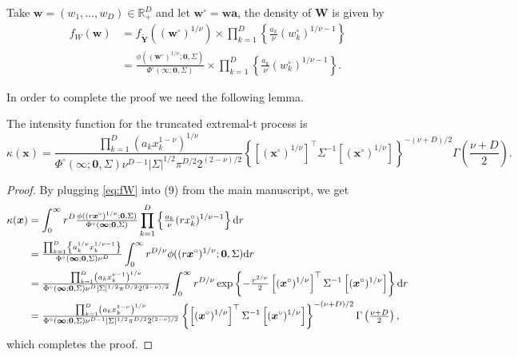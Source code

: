 \documentclass[lineno]{biometrika}
\begin{document}
Take $\bm w = (w_1, \ldots, w_D) \in \mathbb{R}^D_+$ and let $\bm w^\circ = \bm w \bm a$, the density of $\bm W$ is given by
%
\begin{align}
\label{eq:fW}
f_W(\bm w) &= f_{\tilde{\bm Y}} \left( \left( \bm w^\circ \right)^{1/\nu} \right) \times \prod_{k=1}^D \left\{ \frac{a_k}{\nu} \left(w_k^\circ \right)^{1/\nu-1} \right\} \nonumber \\
&= \frac{\phi\left( \left( \bm w^\circ \right)^{1/\nu} ;\bm 0, \Sigma \right)} {\Phi^\circ(\bm \infty;\bm 0, \Sigma)} 
\times \prod_{k=1}^D \left\{ \frac{a_k}{\nu} \left(w_k^\circ\right)^{1/\nu-1} \right\}.
\end{align}
%

In order to complete the proof we need the following lemma.

\begin{lemma}
\label{lem:kappEt}
The intensity function for the truncated extremal-t process is
%
\begin{equation*}
\kappa(\bm x) = \frac{\prod_{k=1}^D \left(a_k x_k^{1-\nu}\right)^{1/\nu}}{\Phi^\circ(\bm \infty;\bm 0, \Sigma) \nu^{D-1}|\Sigma|^{1/2}\pi^{D/2}2^{(2-\nu)/2}} \left\{\left[(\bm x^\circ)^{1/\nu}\right]^\top \Sigma^{-1}\left[(\bm x^\circ)^{1/\nu}\right]\right\}^{-(\nu+D)/2} \Gamma\left(\frac{\nu+D}{2}\right).
\end{equation*}
\end{lemma}

\begin{proof}

By plugging \eqref{eq:fW} into (9) from the main manuscript, we get 
%
\begin{align*}
\kappa(\bm x) &= \int_0^\infty r^D {\textstyle{\phi( (r \bm x^\circ)^{1/\nu};\bm 0, \Sigma)\over\Phi^\circ(\bm \infty;\bm 0, \Sigma)}} \prod_{k=1}^D \left\{ {\textstyle{a_k\over\nu}} (r x_k^\circ)^{1/\nu-1}\right\}\text d r	\\
&= {\textstyle{\prod_{k=1}^D \left\{a_k^{1/\nu} x_k^{1/\nu-1}\right\}\over\Phi^\circ(\bm \infty;\bm 0, \Sigma)\nu^D}}\int_0^\infty r^{D/\nu} \phi( (r\bm x^\circ)^{1/\nu};\bm 0, \Sigma) \text d r\\
&= {\textstyle{\prod_{k=1}^D \left(a_k x_k^{\nu-1}\right)^{1/\nu}\over\Phi^\circ(\bm \infty;\bm 0, \Sigma) \nu^D |\Sigma|^{1/2} \pi^{D/2}2^{(2-\nu)/2}}} \int_0^\infty r^{D/\nu} \exp \left\{-{\textstyle{r^{2/\nu}\over2}} \left[(\bm x^\circ)^{1/\nu}\right]^\top\Sigma^{-1}\left[(\bm x^\circ)^{1/\nu}\right]\right\} \text dr\\
&= {\textstyle{\prod_{k=1}^D \left(a_k x_k^{1-\nu}\right)^{1/\nu}\over\Phi^\circ(\bm \infty;\bm 0, \Sigma) \nu^{D-1}|\Sigma|^{1/2}\pi^{D/2}2^{(2-\nu)/2}}} \left\{\left[(\bm x^\circ)^{1/\nu}\right]^\top \Sigma^{-1}\left[(\bm x^\circ)^{1/\nu}\right]\right\}^{-(\nu+D)/2} \Gamma\left({\textstyle{\nu+D\over2}}\right),
\label{eq:truncated_extremal_t_intensity}
\end{align*}
%
which completes the proof.
%
\end{proof}
\end{document}
